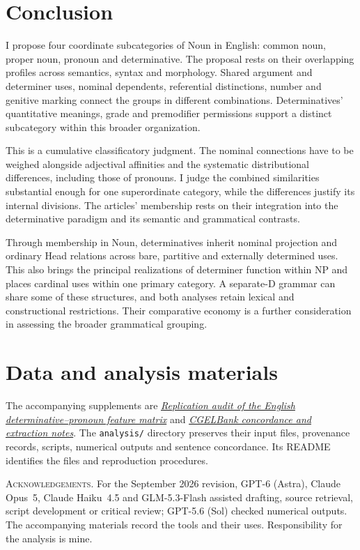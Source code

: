 \documentclass[12pt]{article}
\begin{document}
\section{Conclusion}\label{sec:conclusion}

I propose four coordinate subcategories of Noun in English: common noun, proper noun, pronoun and determinative. The proposal rests on their overlapping profiles across semantics, syntax and morphology. Shared argument and determiner uses, nominal dependents, referential distinctions, number and genitive marking connect the groups in different combinations. Determinatives' quantitative meanings, grade and premodifier permissions support a distinct subcategory within this broader organization.

This is a cumulative classificatory judgment. The nominal connections have to be weighed alongside adjectival affinities and the systematic distributional differences, including those of pronouns. I judge the combined similarities substantial enough for one superordinate category, while the differences justify its internal divisions. The articles' membership rests on their integration into the determinative paradigm and its semantic and grammatical contrasts.

Through membership in Noun, determinatives inherit nominal projection and ordinary Head relations across bare, partitive and externally determined uses. This also brings the principal realizations of determiner function within NP and places cardinal uses within one primary category. A separate-D grammar can share some of these structures, and both analyses retain lexical and constructional restrictions. Their comparative economy is a further consideration in assessing the broader grammatical grouping.

\section*{Data and analysis materials}

The accompanying supplements are \href{run:matrix-audit.pdf}{\textit{Replication audit of the English determinative--pronoun feature matrix}} and \href{run:corpus-documentation.pdf}{\textit{CGELBank concordance and extraction notes}}. The \texttt{analysis/} directory preserves their input files, provenance records, scripts, numerical outputs and sentence concordance. Its README identifies the files and reproduction procedures.

\vspace{0.5\baselineskip}
\noindent\textsc{Acknowledgements.} For the September 2026 revision, GPT-6 (Astra), Claude Opus~5, Claude Haiku~4.5 and GLM-5.3-Flash assisted drafting, source retrieval, script development or critical review; GPT-5.6 (Sol) checked numerical outputs. The accompanying materials record the tools and their uses. Responsibility for the analysis is mine.

\clearpage
\printbibliography
\end{document}

